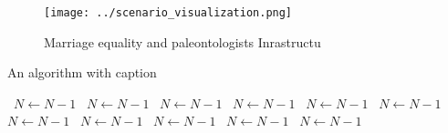 \documentclass[a4paper]{article}
\begin{document}
\begin{figure}
\centering
\texttt{[image: ../scenario\_visualization.png]}
\caption{Marriage equality and paleontologists Inrastructu
}
\end{figure}
 
\begin{algorithm}
\caption{An algorithm with caption}
\begin{algorithmic}
\    \State $N \gets N - 1$
\    \State $N \gets N - 1$
\    \State $N \gets N - 1$
\    \State $N \gets N - 1$
\    \State $N \gets N - 1$
\    \State $N \gets N - 1$
\    \State $N \gets N - 1$
\    \State $N \gets N - 1$
\    \State $N \gets N - 1$
\    \State $N \gets N - 1$
\    \State $N \gets N - 1$
\EndWhile
\end{algorithmic}
\end{algorithm}
\end{document}
